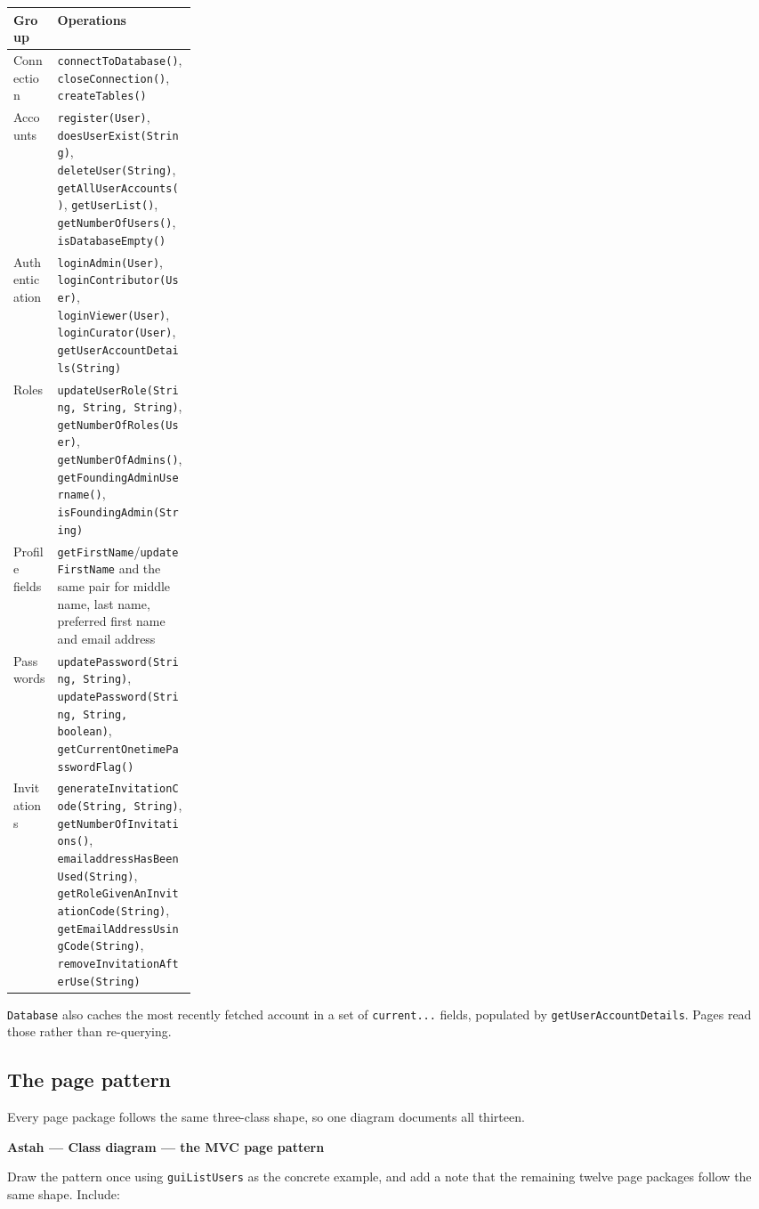 \documentclass[11pt,a4paper]{article}
\newcommand{\astah}[1]{%
  \par\medskip\noindent
  {\color{accent}\bfseries Astah --- #1}\par\nopagebreak\smallskip}
\newcommand{\cls}[1]{\texttt{#1}}
\begin{document}
\begin{center}
\begin{tabularx}{\linewidth}{@{}p{0.24\linewidth}X@{}}
\toprule
\textbf{Group} & \textbf{Operations} \\
\midrule
Connection &
\cls{connectToDatabase()}, \cls{closeConnection()}, \cls{createTables()} \\
\addlinespace
Accounts &
\cls{register(User)}, \cls{doesUserExist(String)}, \cls{deleteUser(String)},
\cls{getAllUserAccounts()}, \cls{getUserList()}, \cls{getNumberOfUsers()},
\cls{isDatabaseEmpty()} \\
\addlinespace
Authentication &
\cls{loginAdmin(User)}, \cls{loginContributor(User)}, \cls{loginViewer(User)},
\cls{loginCurator(User)}, \cls{getUserAccountDetails(String)} \\
\addlinespace
Roles &
\cls{updateUserRole(String, String, String)}, \cls{getNumberOfRoles(User)},
\cls{getNumberOfAdmins()}, \cls{getFoundingAdminUsername()},
\cls{isFoundingAdmin(String)} \\
\addlinespace
Profile fields &
\cls{getFirstName}/\cls{updateFirstName} and the same pair for middle name, last name,
preferred first name and email address \\
\addlinespace
Passwords &
\cls{updatePassword(String, String)},
\cls{updatePassword(String, String, boolean)},
\cls{getCurrentOnetimePasswordFlag()} \\
\addlinespace
Invitations &
\cls{generateInvitationCode(String, String)}, \cls{getNumberOfInvitations()},
\cls{emailaddressHasBeenUsed(String)}, \cls{getRoleGivenAnInvitationCode(String)},
\cls{getEmailAddressUsingCode(String)}, \cls{removeInvitationAfterUse(String)} \\
\bottomrule
\end{tabularx}
\end{center}

\cls{Database} also caches the most recently fetched account in a set of \cls{current...}
fields, populated by \cls{getUserAccountDetails}. Pages read those rather than re-querying.

\subsection{The page pattern}

Every page package follows the same three-class shape, so one diagram documents all
thirteen.

\astah{Class diagram --- the MVC page pattern}
Draw the pattern once using \cls{guiListUsers} as the concrete example, and add a note that
the remaining twelve page packages follow the same shape. Include:
\end{document}
